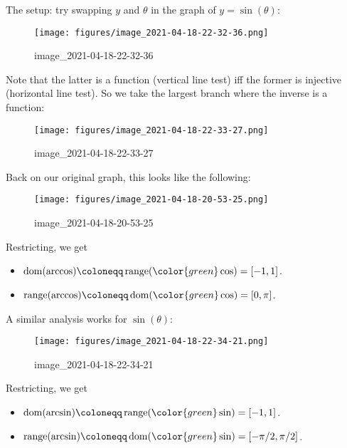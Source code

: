 \begin{remark}

The setup: try swapping \(y\) and \(\theta\) in the graph of
\(y=\sin(\theta)\):

\begin{figure}
\centering
\texttt{[image: figures/image\_2021-04-18-22-32-36.png]}
\caption{image\_2021-04-18-22-32-36}
\end{figure}

Note that the latter is a function (vertical line test) iff the former
is injective (horizontal line test). So we take the largest branch where
the inverse is a function:

\begin{figure}
\centering
\texttt{[image: figures/image\_2021-04-18-22-33-27.png]}
\caption{image\_2021-04-18-22-33-27}
\end{figure}

Back on our original graph, this looks like the following:

\begin{figure}
\centering
\texttt{[image: figures/image\_2021-04-18-20-53-25.png]}
\caption{image\_2021-04-18-20-53-25}
\end{figure}

Restricting, we get

\begin{itemize}
\tightlist
\item
  \(\operatorname{dom}(\arccos) \coloneqq\mathop{\mathrm{range}}({ \color{green} \cos} ) = [-1, 1]\).
\item
  \(\mathop{\mathrm{range}}(\arccos) \coloneqq\operatorname{dom}( {\color{green} \cos} ) = [0, \pi]\).
\end{itemize}

\end{remark}

\begin{remark}

A similar analysis works for \(\sin(\theta)\):

\begin{figure}
\centering
\texttt{[image: figures/image\_2021-04-18-22-34-21.png]}
\caption{image\_2021-04-18-22-34-21}
\end{figure}

Restricting, we get

\begin{itemize}
\tightlist
\item
  \(\operatorname{dom}(\arcsin) \coloneqq\mathop{\mathrm{range}}({ \color{green} \sin} ) = [-1, 1]\).
\item
  \(\mathop{\mathrm{range}}(\arcsin) \coloneqq\operatorname{dom}( {\color{green} \sin }) = [-\pi/2, \pi/2]\).
\end{itemize}

\end{remark}

